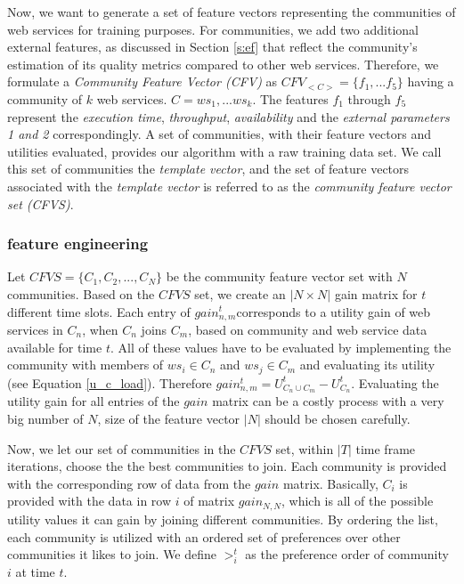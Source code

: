 \documentclass[10pt,journal,cspaper,compsoc]{IEEEtran}
\begin{document}
Now, we want to generate a set of feature vectors representing the communities of web services for training purposes. For communities, we add two additional external features, as discussed in Section \ref{s:ef} that reflect the community's estimation of its quality metrics compared to other web services. Therefore, we formulate a \emph{Community Feature Vector (CFV)} as $CFV_{<C>} = \{f_1,...f_5\}$ having a community of $k$ web services. $C = {ws_1,...ws_k}$. The features $f_1$ through $f_5$ represent the \emph{execution time}, \emph{throughput}, \emph{availability} and the \emph{external parameters 1 and 2} correspondingly. A set of communities, with their feature vectors and utilities evaluated, provides our algorithm with a raw training data set. We call this set of communities the \emph{template vector}, and the set of feature vectors associated with the \emph{template vector} is referred to as the \emph{community feature vector set (CFVS)}.

\subsubsection{feature engineering}\label{sss:feng}
Let $CFVS = \{C_1, C_2,..., C_N\}$ be the community feature vector set with $N$ communities. Based on the $CFVS$ set, we create an $|N \times N|$ gain matrix for $t$ different time slots. Each entry of $gain_{n,m}^{t}$corresponds to a utility gain of web services in $C_n$, when $C_n$ joins $C_m$, based on community and web service data available for time $t$. All of these values have to be evaluated by implementing the community with members of $ws_i \in C_n$ and $ws_j \in C_m$ and evaluating its utility (see Equation \ref{u_c_load}). Therefore $gain_{n,m}^{t} = U_{C_n \cup C_m}^{t} - U_{C_{n}}^{t}$. Evaluating the utility gain for all entries of the $gain$ matrix can be a costly process with a very big number of $N$, size of the feature vector $|N|$ should be chosen carefully. 

Now, we let our set of communities in the $CFVS$ set, within $|T|$ time frame iterations, choose the the best communities to join. Each community is provided with the corresponding row of data from the $gain$ matrix. Basically, $C_i$ is provided with the data in row $i$ of matrix $gain_{N,N}$, which is all of the possible utility values it can gain by joining different communities. By ordering the list, each community is utilized with an ordered set of preferences over other communities it likes to join. We define $>_{i}^t$ as the preference order of community $i$ at time $t$.
\end{document}

